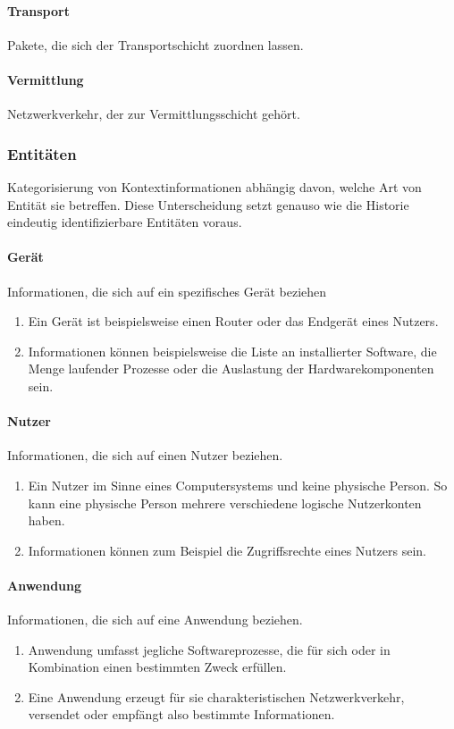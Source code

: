 \paragraph{Transport}
Pakete, die sich der Transportschicht zuordnen lassen.
\paragraph{Vermittlung}
Netzwerkverkehr, der zur Vermittlungsschicht gehört.
\subsubsection{Entitäten}
Kategorisierung von Kontextinformationen abhängig davon, welche Art von Entität sie betreffen.
Diese Unterscheidung setzt genauso wie die Historie eindeutig identifizierbare Entitäten voraus.
\paragraph{Gerät}
Informationen, die sich auf ein spezifisches Gerät beziehen
\begin{enumerate}
\item{Ein Gerät ist beispielsweise einen Router oder das Endgerät eines Nutzers. }
\item{Informationen können beispielsweise die Liste an installierter Software, die Menge laufender Prozesse oder die Auslastung der Hardwarekomponenten sein.}
\end{enumerate}
\paragraph{Nutzer}
Informationen, die sich auf einen Nutzer beziehen.
\begin{enumerate}
\item{Ein Nutzer im Sinne eines Computersystems und keine physische Person. So kann eine physische Person mehrere verschiedene logische Nutzerkonten haben. }
\item{Informationen können zum Beispiel die Zugriffsrechte eines Nutzers sein.}
\end{enumerate}
\paragraph{Anwendung}
Informationen, die sich auf eine Anwendung beziehen.
\begin{enumerate}
\item{Anwendung umfasst jegliche Softwareprozesse, die für sich oder in Kombination einen bestimmten Zweck erfüllen.}
\item{Eine Anwendung erzeugt für sie charakteristischen Netzwerkverkehr, versendet oder empfängt also bestimmte Informationen.}
\end{enumerate}
